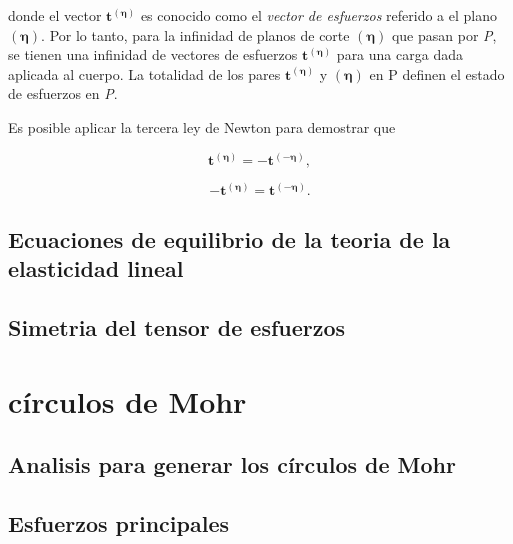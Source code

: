 \documentclass{article}
\begin{document}
    donde el vector $\bm{t^{\bm{(\eta)}}}$ es conocido como el \textit{vector de esfuerzos}
    referido a el plano $\bm{(\eta)}$.
    Por lo tanto, para la infinidad de planos de corte $\bm{(\eta)}$ que pasan por \textit{P},
    se tienen una infinidad de vectores de esfuerzos $\bm{t^{\bm{(\eta)}}}$ para una carga
    dada aplicada al cuerpo. La totalidad de los pares $\bm{t^{\bm{(\eta)}}}$ y $\bm{(\eta)}$
    en P definen el estado de esfuerzos en \textit{P}.

    Es posible aplicar la tercera ley de Newton para demostrar que

    \begin{equation}
        \bm{t^{\bm{(\eta)}}} = - \bm{t^{\bm{(-\eta)}}},
    \end{equation}

    \begin{equation}
        -\bm{t^{\bm{(\eta)}}} = \bm{t^{\bm{(-\eta)}}}.
    \end{equation}

    \subsection{Ecuaciones de equilibrio de la teoria de la elasticidad lineal}
    \subsection{Simetria del tensor de esfuerzos}
    \section{círculos de Mohr}
    \subsection{Analisis para generar los círculos de Mohr}
    \subsection{Esfuerzos principales}
\end{document}
